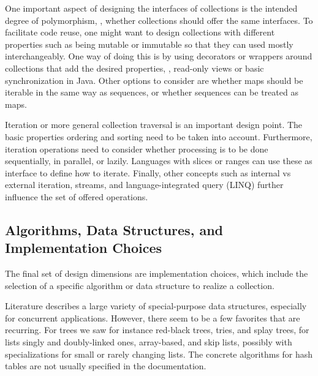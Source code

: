 \documentclass[sigconf, 10pt]{acmart}
\begin{document}

One important aspect of designing the interfaces of collections is the intended
degree of polymorphism,
\ie, whether collections should offer the same interfaces.
To facilitate code reuse, one might want to design collections
with different properties such as being mutable or immutable
so that they can used mostly interchangeably.
One way of doing this is by using decorators or wrappers around collections
that add the desired properties, \eg, read-only views or basic synchronization in Java.
Other options to consider are whether maps should be iterable
in the same way as sequences, or whether sequences can be treated as maps.


Iteration or more general collection traversal is an important design point.
The basic properties ordering and sorting need to be taken into account.
Furthermore, iteration operations need to consider whether processing is
to be done sequentially, in parallel, or lazily.
Languages with slices or ranges can use these as interface
to define how to iterate.
Finally, other concepts such as internal vs external iteration, streams,
and language-integrated query (LINQ)
further influence the set of offered operations.

\subsection{Algorithms, Data Structures, and Implementation Choices}
\label{sec:impl-choices}

The final set of design dimensions are implementation choices,
which include the selection of a specific algorithm or data structure
to realize a collection.

Literature describes a large variety of special-purpose
data structures, especially for concurrent applications.
However, there seem to be a few favorites that are recurring.
For
trees we saw for instance red-black trees, tries, and splay trees,
for lists singly and doubly-linked ones, array-based, and skip lists,
possibly with specializations for small or rarely changing lists.
%
The concrete algorithms for hash tables are not usually specified
in the documentation.
\end{document}

